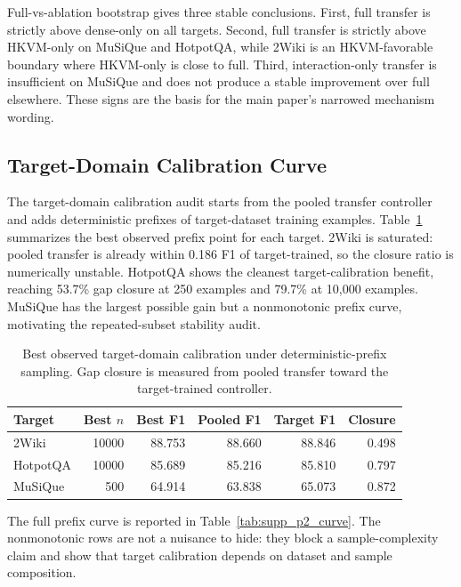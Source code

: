 \documentclass[conference]{IEEEtran}
\begin{document}
Full-vs-ablation bootstrap gives three stable conclusions. First, full transfer is strictly above dense-only on all targets. Second, full transfer is strictly above HKVM-only on MuSiQue and HotpotQA, while 2Wiki is an HKVM-favorable boundary where HKVM-only is close to full. Third, interaction-only transfer is insufficient on MuSiQue and does not produce a stable improvement over full elsewhere. These signs are the basis for the main paper's narrowed mechanism wording.

\subsection{Target-Domain Calibration Curve}

The target-domain calibration audit starts from the pooled transfer controller and adds deterministic prefixes of target-dataset training examples. Table~\ref{tab:supp_p2_best_calibration} summarizes the best observed prefix point for each target. 2Wiki is saturated: pooled transfer is already within 0.186 F1 of target-trained, so the closure ratio is numerically unstable. HotpotQA shows the cleanest target-calibration benefit, reaching 53.7\% gap closure at 250 examples and 79.7\% at 10,000 examples. MuSiQue has the largest possible gain but a nonmonotonic prefix curve, motivating the repeated-subset stability audit.

\begin{table}[t]
\caption{Best observed target-domain calibration under deterministic-prefix sampling. Gap closure is measured from pooled transfer toward the target-trained controller.}
\label{tab:supp_p2_best_calibration}
\centering
\scriptsize
\begin{tabular}{lrrrrr}
\toprule
Target & Best $n$ & Best F1 & Pooled F1 & Target F1 & Closure \\
\midrule
2Wiki & 10000 & 88.753 & 88.660 & 88.846 & 0.498 \\
HotpotQA & 10000 & 85.689 & 85.216 & 85.810 & 0.797 \\
MuSiQue & 500 & 64.914 & 63.838 & 65.073 & 0.872 \\
\bottomrule
\end{tabular}
\end{table}

The full prefix curve is reported in Table~\ref{tab:supp_p2_curve}. The nonmonotonic rows are not a nuisance to hide: they block a sample-complexity claim and show that target calibration depends on dataset and sample composition.
\end{document}
